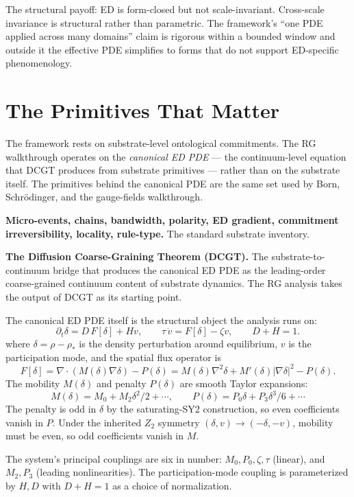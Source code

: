 \documentclass[11pt,a4paper]{article}
\begin{document}
The structural payoff: ED is form-closed but not scale-invariant. Cross-scale invariance is structural rather than parametric. The framework's ``one PDE applied across many domains'' claim is rigorous within a bounded window and outside it the effective PDE simplifies to forms that do not support ED-specific phenomenology.

\section{The Primitives That Matter}

The framework rests on substrate-level ontological commitments. The RG walkthrough operates on the \emph{canonical ED PDE} --- the continuum-level equation that DCGT produces from substrate primitives --- rather than on the substrate itself. The primitives behind the canonical PDE are the same set used by Born, Schr\"odinger, and the gauge-fields walkthrough.

\textbf{Micro-events, chains, bandwidth, polarity, ED gradient, commitment irreversibility, locality, rule-type.} The standard substrate inventory.

\textbf{The Diffusion Coarse-Graining Theorem (DCGT).} The substrate-to-continuum bridge that produces the canonical ED PDE as the leading-order coarse-grained continuum content of substrate dynamics. The RG analysis takes the output of DCGT as its starting point.

The canonical ED PDE itself is the structural object the analysis runs on:
\[
\partial_t \delta = D\, F[\delta] + H v, \qquad \tau\, \dot v = F[\delta] - \zeta v, \qquad D + H = 1.
\]
where $\delta = \rho - \rho_*$ is the density perturbation around equilibrium, $v$ is the participation mode, and the spatial flux operator is
\[
F[\delta] = \nabla \cdot (M(\delta) \nabla \delta) - P(\delta) = M(\delta) \nabla^{2}\delta + M'(\delta) |\nabla \delta|^{2} - P(\delta).
\]
The mobility $M(\delta)$ and penalty $P(\delta)$ are smooth Taylor expansions:
\[
M(\delta) = M_0 + M_2 \delta^{2}/2 + \cdots, \qquad P(\delta) = P_0 \delta + P_3 \delta^{3}/6 + \cdots
\]
The penalty is odd in $\delta$ by the saturating-SY2 construction, so even coefficients vanish in $P$. Under the inherited $Z_2$ symmetry $(\delta, v) \to (-\delta, -v)$, mobility must be even, so odd coefficients vanish in $M$.

The system's principal couplings are six in number: $M_0, P_0, \zeta, \tau$ (linear), and $M_2, P_3$ (leading nonlinearities). The participation-mode coupling is parameterized by $H, D$ with $D + H = 1$ as a choice of normalization.
\end{document}
